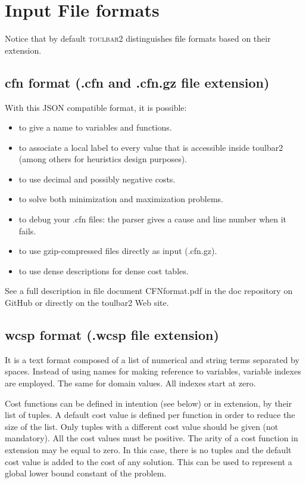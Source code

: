 \documentclass{article}
\def\toulbar2{\textsc{toulbar2}}
\begin{document}
\section{Input File formats}
\label{file-formats}
Notice that by default \toulbar2 distinguishes file formats based on their extension.
\subsection{cfn format (.cfn and .cfn.gz file extension)}
With this JSON compatible format, it is possible:
\begin{itemize}
\item to give a name to variables and functions.
\item to associate a local label to every value that is accessible inside toulbar2 (among others for heuristics design purposes).
\item to use decimal and possibly negative costs.
\item to solve both minimization and maximization problems.
\item to debug  your .cfn files: the parser gives a cause and line number when it fails.
\item to use gzip-compressed files directly as input (.cfn.gz).
\item to use dense descriptions for dense cost tables.
\end{itemize}

See a full description in file document CFNformat.pdf in the doc repository on GitHub or directly on the toulbar2 Web site.

\subsection{wcsp format (.wcsp file extension)}

It is a text format composed of a list of numerical and string terms separated by spaces. Instead of using names for making reference to variables, variable indexes are employed. The same for domain values. All indexes start at zero.

Cost functions can be defined in intention (see below) or in extension, by their list of tuples. A default cost value is defined per function in order to reduce the size of the list. Only tuples with a different cost value should be given (not mandatory). All the cost values must be positive. The arity of a cost function in extension may be equal to zero. In this case, there is no tuples and the default cost value is added to the cost of any solution. This can be used to represent a global lower bound constant of the problem.
\end{document}
